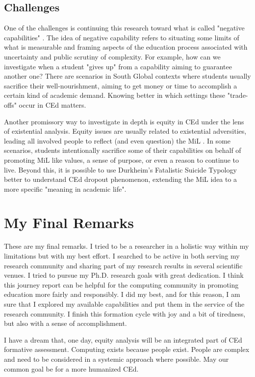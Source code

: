         

        

\subsection{Challenges}

 One of the challenges is continuing this research toward what is called "negative capabilities" \cite{unterhalter:2020}. The idea of negative capability refers to situating some limits of what is measurable and framing aspects of the education process associated with uncertainty and public scrutiny of complexity. For example, how can we investigate when a student "gives up" from a capability aiming to guarantee another one? There are scenarios in South Global contexts where students usually sacrifice their well-nourishment, aiming to get money or time to accomplish a certain kind of academic demand. Knowing better in which settings these "trade-offs" occur in \gls{CEd} matters.

 Another promissory way to investigate in depth is equity in \gls{CEd} under the lens of existential analysis. Equity issues are usually related to existential adversities, leading all involved people to reflect (and even question) the \gls{MiL} \cite{manco:2021}. In some scenarios, students intentionally sacrifice some of their capabilities on behalf of promoting \gls{MiL} like values, a sense of purpose, or even a reason to continue to live. Beyond this, it is possible to use Durkheim's Fatalistic Suicide Typology \cite{godor:2017} better to understand \gls{CEd} dropout phenomenon, extending the \gls{MiL} idea to a more specific "meaning in academic life".

 \section{My Final Remarks}
 \label{conclusions-sec:my-final-remarks}

 These are my final remarks. I tried to be a researcher in a holistic way within my limitations but with my best effort. I searched to be active in both serving my research community and sharing part of my research results in several scientific venues. I tried to pursue my \gls{Ph.D.} research goals with great dedication. I think this journey report can be helpful for the computing community in promoting education more fairly and responsibly. I did my best, and for this reason, I am sure that I explored my available capabilities and put them in the service of the research community. I finish this formation cycle with joy and a bit of tiredness, but also with a sense of accomplishment.

  I have a dream that, one day, equity analysis will be an integrated part of \gls{CEd} formative assessment. Computing exists because people exist. People are complex and need to be considered in a systemic approach where possible. May our common goal be for a more humanized \gls{CEd}.



